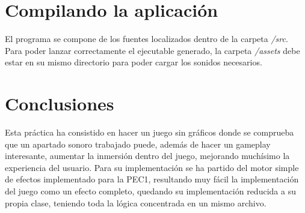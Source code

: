 \documentclass[12pt]{article}%
\begin{document}
\section{Compilando la aplicación}
	El programa se compone de los fuentes localizados dentro de la carpeta \textit{/src}. Para poder lanzar correctamente el ejecutable generado, la carpeta \textit{/assets} debe estar en su mismo directorio para poder cargar los sonidos necesarios.
	
\section{Conclusiones}
	
	Esta práctica ha consistido en hacer un juego sin gráficos donde se comprueba que un apartado sonoro trabajado puede, además de hacer un gameplay interesante, aumentar la inmersión dentro del juego, mejorando muchísimo la experiencia del usuario. Para su implementación se ha partido del motor simple de efectos implementado para la PEC1, resultando muy fácil la implementación del juego como un efecto completo, quedando su implementación reducida a su propia clase, teniendo toda la lógica concentrada en un mismo archivo.
	
\end{document}
